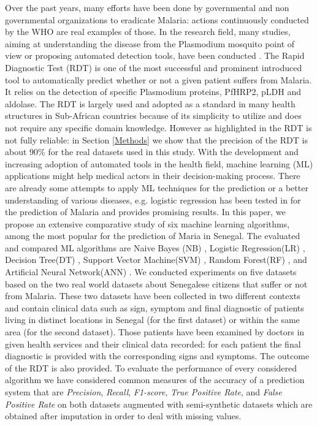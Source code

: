Over the past years, many efforts have been done by governmental and non governmental organizations  to eradicate Malaria:  actions continuously conducted by the WHO are real examples of those.  In the research field, many studies, aiming at understanding the disease from the Plasmodium mosquito point of view or proposing automated detection tools, have been conducted \cite{Ga19,Le74,ermert2011development,Hu17}. The Rapid Diagnostic Test (RDT) \cite{Hu17} is one of the most successful and prominent introduced tool to automatically predict whether or not a given patient suffers from Malaria. It relies on the
detection of specific Plasmodium proteins, PfHRP2, pLDH
and aldolase. The RDT is largely used and adopted as a standard in many health structures in Sub-African countries because of its simplicity to utilize and does not require any specific domain knowledge. However as highlighted in \cite{Hu17} the RDT is not fully reliable:  in Section \ref{Methods} we show that the precision of the RDT is about 90\% for the real datasets used in this study.
With the development and increasing adoption of automated tools in the health field, machine learning  (ML) \cite{mitchell1997machine, Ug1} applications might help medical actors in their decision-making process. There are already some attempts to apply ML techniques for the prediction or a better understanding of various diseases, e.g. logistic regression has been tested in \cite{mbaye2019towards} for the prediction of Malaria and provides promising results.
 In this paper, we propose an  extensive comparative study of six machine learning algorithms, among the most popular for the prediction of Maria in Senegal. The evaluated and compared ML algorithms are Naive Bayes (NB) \cite{Ka17}, Logistic Regression(LR) \cite{Ph88},  Decision Tree(DT) \cite{Ro05}, Support Vector Machine(SVM) \cite{Ev01},
 Random Forest(RF) \cite{Be01},
 and Artificial Neural Network(ANN) \cite{Me19}. We conducted experiments on five datasets based on the two real world datasets about Senegalese citizens that suffer or not from Malaria. These two datasets have been collected in two different contexts and contain clinical data such as sign, symptom and final diagnostic of patients living in distinct locations in Senegal (for the first dataset) or within the same area (for the second dataset). Those patients have been examined by doctors in given health services and their clinical data recorded: for each patient the final diagnostic is provided with the corresponding signs and symptoms. The outcome of the RDT is also provided. To evaluate the performance of every considered algorithm we have considered common measures of the accuracy of a prediction system that are \emph{Precision}, \emph{Recall}, \emph{F1-score}, \emph{True Positive Rate}, and
 \emph{False Positive Rate} on both datasets augmented with semi-synthetic datasets which are obtained after imputation in order to deal with missing values.\\
 
